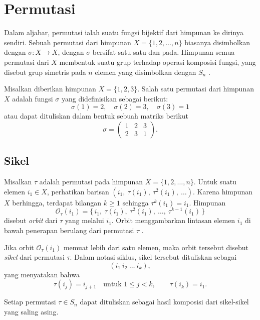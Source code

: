 \section{Permutasi}
Dalam aljabar, permutasi ialah suatu fungsi bijektif dari himpunan ke dirinya sendiri. Sebuah permutasi dari himpunan $X = \{1, 2, \ldots, n\}$ biasanya disimbolkan dengan $\sigma: X \to X$, dengan $\sigma$ bersifat satu-satu dan pada. Himpunan semua permutasi dari $X$ membentuk suatu grup terhadap operasi komposisi fungsi, yang disebut grup simetris pada $n$ elemen yang disimbolkan dengan $S_n$ \parencite{subiono2022aljabar}.
\begin{contoh}
  Misalkan diberikan himpunan $X = \{1, 2, 3\}$. Salah satu permutasi dari himpunan $X$ adalah fungsi $\sigma$ yang didefinisikan sebagai berikut:
  \[
    \sigma(1) = 2, \quad \sigma(2) = 3, \quad \sigma(3) = 1
  \]
  atau dapat dituliskan dalam bentuk sebuah matriks berikut
  \[
    \sigma = \begin{pmatrix}
      1 & 2 & 3 \\
      2 & 3 & 1
    \end{pmatrix}.
  \]
\end{contoh}
\subsection{Sikel}
Misalkan $\tau$ adalah permutasi pada himpunan $X = \{1,2,\ldots,n\}$.
Untuk suatu elemen $i_1 \in X$, perhatikan barisan
$
  (i_1,\ \tau(i_1),\ \tau^2(i_1),\ \ldots).
$
Karena himpunan $X$ berhingga, terdapat bilangan $k \ge 1$ sehingga
$
  \tau^{k}(i_1) = i_1.
$
Himpunan
\[
  \mathcal{O}_{\tau}(i_1)
  =
  \{\, i_1,\ \tau(i_1),\ \tau^{2}(i_1),\ \ldots,\ \tau^{k-1}(i_1)\,\}
\]
disebut \emph{orbit} dari $\tau$ yang melalui $i_1$.
Orbit menggambarkan lintasan elemen $i_1$ di bawah penerapan berulang dari permutasi $\tau$ \parencite{subiono2022aljabar}.

\begin{definisi}
  Jika orbit $\mathcal{O}_{\tau}(i_1)$ memuat lebih dari satu elemen, maka orbit tersebut disebut
  \emph{sikel} dari permutasi $\tau$. Dalam notasi siklus, sikel tersebut dituliskan sebagai
  \[
    (i_1\ i_2\ \ldots\ i_k),
  \]
  yang menyatakan bahwa
  \[
    \tau(i_j) = i_{j+1} \quad \text{untuk } 1 \le j < k,
    \qquad
    \tau(i_k) = i_1.
  \]
\end{definisi}

\begin{teorema}
  Setiap permutasi $\tau\in S_n$ dapat dituliskan sebagai hasil komposisi dari sikel-sikel yang saling asing.
\end{teorema}

